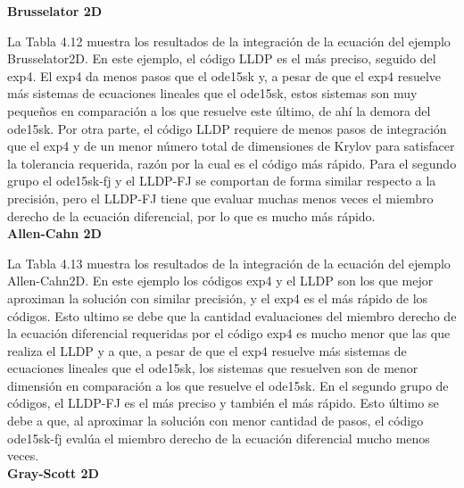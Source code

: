 \textbf{Brusselator 2D}

La Tabla 4.12 muestra los resultados de la integración de la ecuación del ejemplo Brusselator2D. En este ejemplo, el código LLDP es el más preciso, seguido del exp4. El exp4 da menos pasos que el ode15sk y, a pesar de que el exp4 resuelve más sistemas de ecuaciones lineales que el ode15sk, estos sistemas son muy peque\~nos en comparación a los que resuelve este último, de
ahí la demora del ode15sk. Por otra parte, el código LLDP requiere de menos  pasos de integración que el exp4 y de un menor número total de dimensiones de Krylov para satisfacer la tolerancia requerida, razón por la cual es el código más rápido. Para el segundo grupo el ode15sk-fj y el LLDP-FJ se comportan de forma similar respecto a la precisión, pero el LLDP-FJ tiene que evaluar muchas menos veces el miembro derecho de la ecuación diferencial, por lo que es mucho más rápido.
\\
\textbf{Allen-Cahn 2D}

La Tabla 4.13 muestra los resultados de la integración de la ecuación del ejemplo Allen-Cahn2D. En este ejemplo los códigos exp4 y el LLDP  son los que mejor aproximan la solución con similar precisión, y el exp4 es el más rápido de los códigos. Esto ultimo se debe que la cantidad evaluaciones del miembro derecho de la ecuación diferencial requeridas por el código exp4 es mucho menor que las que realiza el LLDP y a que, a pesar de que el exp4 resuelve más sistemas de ecuaciones lineales que el ode15sk, los sistemas que resuelven son de menor dimensión en comparación a los que resuelve el ode15sk. En el segundo grupo de códigos, el LLDP-FJ es el más preciso y también el más rápido. Esto último se debe a que, al aproximar la solución con menor cantidad de pasos, el código ode15sk-fj evalúa el miembro derecho de la ecuación diferencial mucho menos veces.
\\
\textbf{Gray-Scott 2D}

